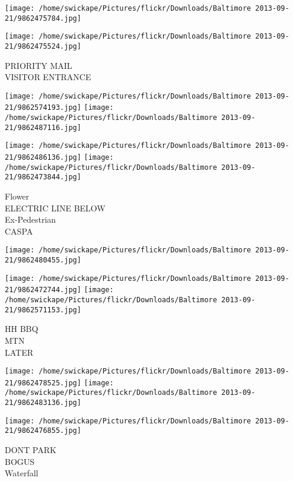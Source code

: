 \documentclass[10pt,letterpaper]{article}
\begin{document}
\texttt{[image: /home/swickape/Pictures/flickr/Downloads/Baltimore 2013-09-21/9862475784.jpg]}

\vspace{0.25in}
\texttt{[image: /home/swickape/Pictures/flickr/Downloads/Baltimore 2013-09-21/9862475524.jpg]}

PRIORITY MAIL\\
VISITOR ENTRANCE\\
\pagebreak

\texttt{[image: /home/swickape/Pictures/flickr/Downloads/Baltimore 2013-09-21/9862574193.jpg]}
\texttt{[image: /home/swickape/Pictures/flickr/Downloads/Baltimore 2013-09-21/9862487116.jpg]}

\texttt{[image: /home/swickape/Pictures/flickr/Downloads/Baltimore 2013-09-21/9862486136.jpg]}
\texttt{[image: /home/swickape/Pictures/flickr/Downloads/Baltimore 2013-09-21/9862473844.jpg]}

Flower\\
ELECTRIC LINE BELOW\\
Ex{-}Pedestrian\\
CASPA\\
\pagebreak

\texttt{[image: /home/swickape/Pictures/flickr/Downloads/Baltimore 2013-09-21/9862480455.jpg]}

\vspace{0.25in}
\texttt{[image: /home/swickape/Pictures/flickr/Downloads/Baltimore 2013-09-21/9862472744.jpg]}
\texttt{[image: /home/swickape/Pictures/flickr/Downloads/Baltimore 2013-09-21/9862571153.jpg]}

HH BBQ\\
MTN\\
LATER\\
\pagebreak

\texttt{[image: /home/swickape/Pictures/flickr/Downloads/Baltimore 2013-09-21/9862478525.jpg]}
\texttt{[image: /home/swickape/Pictures/flickr/Downloads/Baltimore 2013-09-21/9862483136.jpg]}

\vspace{0.25in}
\texttt{[image: /home/swickape/Pictures/flickr/Downloads/Baltimore 2013-09-21/9862476855.jpg]}

DONT PARK\\
BOGUS\\
Waterfall\\
\pagebreak
\end{document}
